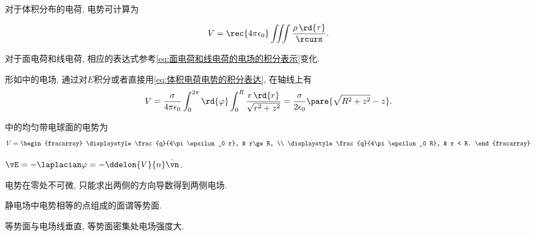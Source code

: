 \documentclass[../Electromagnetism.tex]{subfiles}
\begin{document}
\begin{corollary}[电势的显式表达]
	对于体积分布的电荷, 电势可计算为
	\begin{finale}
		\begin{equation}
			\label{eq:体积电荷电势的积分表达}
			V = \rec{4\pi\epsilon_0} \iiint\frac{\rho\,\rd{\tau}}{\rcurs}.
		\end{equation}
	\end{finale}
	对于面电荷和线电荷, 相应的表达式参考\eqref{eq:面电荷和线电荷的电场的积分表示}变化.
\end{corollary}
\begin{ex}
	\label{ex:均匀带电圆盘的电势}
	形如中的电场, 通过对$E$积分或者直接用\eqref{eq:体积电荷电势的积分表达}, 在轴线上有
	\[ V = \frac{\sigma}{4\pi\epsilon_0}\int_0^{2\pi}\rd{\varphi}\int_0^R \frac{r\,\rd{r}}{\sqrt{r^2+z^2}} = \frac{\sigma}{2\epsilon_0}\pare{\sqrt{R^2+z^2}-z}. \]
\end{ex}
\begin{ex}
	\label{ex:均匀带电球面的电势}
	中的均匀带电球面的电势为
	\[  
		V = 
		\begin{fracarray}
			\displaystyle
			\frac{q}{4\pi\epsilon_0 r}, & r\ge R, \\
			\displaystyle
			\frac{q}{4\pi\epsilon_0 R}, & r < R.
		\end{fracarray}
	 \]
\end{ex}
\begin{finale}
	\begin{corollary}[静电电场与电势]
		$\vE = -\laplacian \varphi = -\ddelon{V}{n}\hat{\vn}$.
	\end{corollary}
\end{finale}
\begin{pitfall}
	电势在零处不可微, 只能求出两侧的方向导数得到两侧电场.
\end{pitfall}
\begin{definition}[等势面]
	静电场中电势相等的点组成的面谓等势面.
\end{definition}
\begin{corollary}[等势面与电场]
	等势面与电场线垂直, 等势面密集处电场强度大.
\end{corollary}




\end{document}
